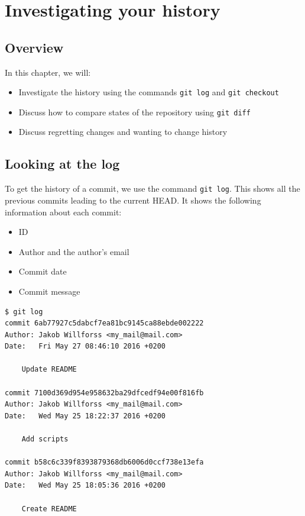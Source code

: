 \documentclass[../main/git_course_main.tex]{subfiles}
\begin{document}
\setcounter{chapter}{2}
\chapter{Investigating your history}

\section{Overview}

In this chapter, we will:

\begin{itemize}
	\item Investigate the history using the commands \verb$git log$ and \verb$git checkout$
	\item Discuss how to compare states of the repository using \verb$git diff$
	\item Discuss regretting changes and wanting to change history
\end{itemize}

\section{Looking at the log}

To get the history of a commit, we use the command \verb$git log$. This shows all the previous commits leading to the current HEAD. It shows the following information about each commit:


\begin{itemize}
	\item ID
	\item Author and the author's email
	\item Commit date
	\item Commit message
\end{itemize}

\begin{codebox}
\begin{lstlisting}
$ git log
commit 6ab77927c5dabcf7ea81bc9145ca88ebde002222
Author: Jakob Willforss <my_mail@mail.com>
Date:   Fri May 27 08:46:10 2016 +0200

    Update README

commit 7100d369d954e958632ba29dfcedf94e00f816fb
Author: Jakob Willforss <my_mail@mail.com>
Date:   Wed May 25 18:22:37 2016 +0200

    Add scripts

commit b58c6c339f8393879368db6006d0ccf738e13efa
Author: Jakob Willforss <my_mail@mail.com>
Date:   Wed May 25 18:05:36 2016 +0200

    Create README
\end{lstlisting}
\end{codebox}
\end{document}
